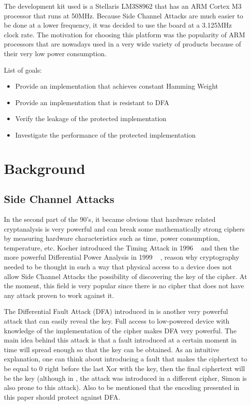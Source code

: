 \documentclass[conference]{IEEEtran}
\begin{document}
The development kit used is a Stellaris LM3S8962 that has an ARM Cortex M3 processor that runs at 50MHz. Because Side Channel Attacks are much easier to be done at a lower frequency, it was decided to use the board at a 3.125MHz clock rate. The motivation for choosing this platform was the popularity of ARM processors that are nowadays used in a very wide variety of products because of their very low power consumption.

List of goals:
\begin{itemize}
\item Provide an implementation that achieves constant Hamming Weight
\item Provide an implementation that is resistant to DFA
\item Verify the leakage of the protected implementation
\item Investigate the performance of the protected implementation
\end{itemize}

\section{Background}

\subsection{Side Channel Attacks}

In the second part of the 90's, it became obvious that hardware related cryptanalysis is very powerful and can break some mathematically strong ciphers by measuring hardware characteristics such as time, power consumption, temperature, etc. Kocher introduced the Timing Attack in 1996 ~\cite{KocherTiming} and then the more powerful Differential Power Analysis in 1999 ~\cite{KocherDPA} , reason why cryptography needed to be thought in such a way that physical access to a device does not allow Side Channel Attacks the possibility of discovering the key of the cipher. At the moment, this field is very popular since there is no cipher that does not have any attack proven to work against it.

The Differential Fault Attack (DFA) introduced in \cite{Piret} is another very powerful attack that can easily reveal the key. Full access to low-powered device with knowledge of the implementation of the cipher makes DFA very powerful. The main idea behind this attack is that a fault introduced at a certain moment in time will spread enough so that the key can be obtained. As an intuitive explanation, one can think about introducing a fault that makes the ciphertext to be equal to 0 right before the last Xor with the key, then the final ciphertext will be the key (although in \cite{Piret} , the attack was introduced in a different cipher, Simon is also prone to this attack). Also to be mentioned that the encoding presented in this paper should protect against DFA. 
\end{document}
